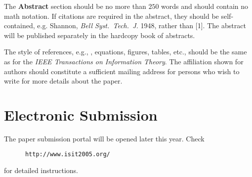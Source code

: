 \documentclass[10pt,conference]{IEEEtran}
\begin{document}
The {\bf Abstract} section should be no more than $250$ words and
should contain no math notation. If citations are required in the abstract, they should be self-contained, e.g. Shannon, \emph{Bell Syst.\ Tech.\ J.} 1948, rather than [1]. The abstract will be published separately in the hardcopy book of abstracts.

The style of references, e.g.,
\cite{Shannon1948}, equations, figures, tables, etc., should be the
same as for the \emph{IEEE Transactions on Information Theory}. The
affiliation shown for authors should constitute a sufficient mailing
address for persons who wish to write for more details about the
paper.

\section{Electronic Submission}
The paper submission portal will be opened later this year.  Check
\begin{verbatim}
      http://www.isit2005.org/
\end{verbatim}
for detailed instructions. 

%


%
\end{document}
